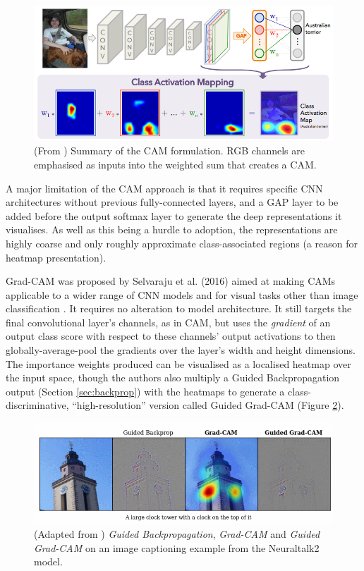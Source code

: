 \documentclass[main]{subfiles}
\begin{document}
\begin{figure}[h]
\centering
\includegraphics[scale=0.5]{cam.png}
\caption{(From \cite{cam}) Summary of the CAM formulation. RGB channels are emphasised as inputs into the weighted sum that creates a CAM.}
\label{camimg}
\end{figure}

A major limitation of the CAM approach is that it requires specific CNN architectures without previous fully-connected layers, and a GAP layer to be added before the output softmax layer to generate the deep representations it visualises. As well as this being a hurdle to adoption, the representations are highly coarse and only roughly approximate class-associated regions (a reason for heatmap presentation).

Grad-CAM was proposed by Selvaraju et al. (2016) aimed at making CAMs applicable to a wider range of CNN models and for visual tasks other than image classification \cite{gradcam}. It requires no alteration to model architecture. It still targets the final convolutional layer's channels, as in CAM, but uses the \textit{gradient} of an output class score with respect to these channels' output activations to then globally-average-pool the gradients over the layer's width and height dimensions. The importance weights produced can be visualised as a localised heatmap over the input space, though the authors also multiply a Guided Backpropagation output (Section \ref{sec:backprop}) with the heatmaps to generate a class-discriminative, ``high-resolution'' version called Guided Grad-CAM (Figure \ref{gradimg}).

\begin{figure}[h]
\centering
\includegraphics[scale=0.6]{gradcam_I.png}
\caption{(Adapted from \cite{gradcam}) \textit{Guided Backpropagation}, \textit{Grad-CAM} and \textit{Guided Grad-CAM} on an image captioning example from the Neuraltalk2 model.}
\label{gradimg}
\end{figure}
\end{document}
